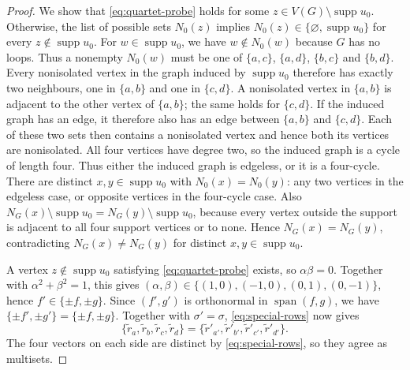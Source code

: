 \documentclass[10pt,a4paper]{article}
\theoremstyle{plain}
\theoremstyle{definition}
\DeclareMathOperator{\supp}{supp}
\DeclareMathOperator{\spn}{span}
\begin{document}
\begin{proof}
  We show that \cref{eq:quartet-probe} holds for some
  $z\in V(G)\setminus\supp u_0$. Otherwise, the list of
  possible sets $N_0(z)$ implies
  $N_0(z)\in\{\varnothing,\supp u_0\}$ for every
  $z\notin\supp u_0$.
  For $w\in\supp u_0$, we have $w\notin N_0(w)$ because $G$ has no loops.
  Thus a nonempty $N_0(w)$ must be one of
  $\{a,c\}$, $\{a,d\}$, $\{b,c\}$ and $\{b,d\}$.
  Every nonisolated vertex in the graph induced by $\supp u_0$
  therefore has exactly two neighbours, one in $\{a,b\}$ and one in
  $\{c,d\}$. A nonisolated vertex in $\{a,b\}$ is adjacent to the
  other vertex of $\{a,b\}$; the same holds for $\{c,d\}$.
  If the induced graph has an edge, it therefore also has an edge
  between $\{a,b\}$ and $\{c,d\}$.
  Each of these two sets then contains a nonisolated vertex and hence
  both its vertices are nonisolated. All four vertices have degree two,
  so the induced graph is a cycle of length four.
  Thus either the induced graph is edgeless, or it is a four-cycle.
  There are distinct $x,y\in\supp u_0$ with $N_0(x)=N_0(y)$:
  any two vertices in the edgeless case, or opposite vertices in the
  four-cycle case. Also
  $N_G(x)\setminus\supp u_0=N_G(y)\setminus\supp u_0$, because every
  vertex outside the support is adjacent to all four support vertices
  or to none. Hence $N_G(x)=N_G(y)$, contradicting
  $N_G(x)\ne N_G(y)$ for distinct $x,y\in\supp u_0$.

  A vertex $z\notin\supp u_0$ satisfying \cref{eq:quartet-probe}
  exists, so $\alpha\beta=0$. Together with $\alpha^2+\beta^2=1$,
  this gives $(\alpha,\beta)\in\{(1,0),(-1,0),(0,1),(0,-1)\}$,
  hence $f'\in\{\pm f,\pm g\}$. Since $(f',g')$ is orthonormal in
  $\spn(f,g)$, we have $\{\pm f',\pm g'\}=\{\pm f,\pm g\}$.
  Together with $\sigma'=\sigma$, \cref{eq:special-rows} now gives
  \begin{equation}\label{eq:quartet-row-equality}
    \{\tilde{r}_a,\tilde{r}_b,\tilde{r}_c,\tilde{r}_d\}
    =\{\tilde{r}'_{a'},\tilde{r}'_{b'},\tilde{r}'_{c'},\tilde{r}'_{d'}\}.
  \end{equation}
  The four vectors on each side are distinct by \cref{eq:special-rows},
  so they agree as multisets.
\end{proof}
\end{document}
